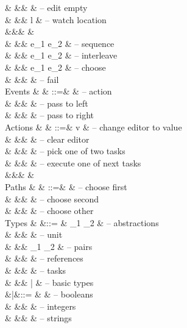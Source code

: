\begin{grammar}
    &        &\mid& \Empty \tau                 & – edit empty \\
    &        &\mid& \Watch l                    & – watch location \\
    &&\divert{\mid}&      &  \\
    &        &\mid& e_1 \When e_2               & – sequence \\
    &        &\mid& e_1 \And e_2                & – interleave \\
    &        &\mid& e_1 \Or e_2                 & – choose \\
    &        &\mid& \Fail                       & – fail \\
  Events
    & \eta   & ::=& \alpha                      & – action \\
    &        &\mid& \Left \eta                  & – pass to left \\
    &        &\mid& \Right \eta                 & – pass to right \\
  Actions
    & \alpha & ::=& v                           & – change editor to value \\
    &        &\mid& \Clear                      & – clear editor \\
    &        &\mid& \Pick \pi                   & – pick one of two tasks \\
    &        &\mid& \Execute \pi                & – execute one of next tasks \\
    &&\divert{\mid}& \divert{\Next}             &  \\
  Paths
    & \pi    & ::=& \First                      & – choose first \\
    &        &\mid& \Second                     & – choose second \\
    &        &\mid& \Other \pi                  & – choose other \\
  Types
    & \tau   &::= & \tau_1 \to \tau_2           & – abstractions \\
    &        &\mid& \Unit                       & – unit \\
    &        &\mid& \tau_1 \times \tau_2        & – pairs \\
    &        &\mid& \Reference \tau             & – references \\
    &        &\mid& \Task \tau                  & – tasks \\
    &        &\mid& \bar{\tau}                  & – basic types \\
  &\bar{\tau}&::= & \Bool                       & – booleans \\
    &        &\mid& \Int                        & – integers \\
    &        &\mid& \String                     & – strings \\
\end{grammar}


